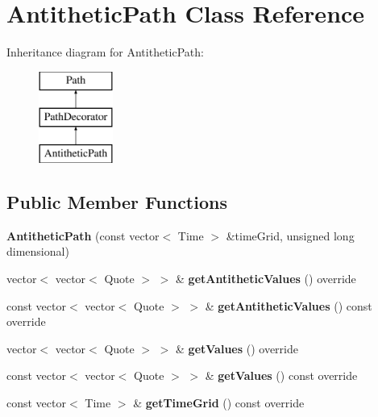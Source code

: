 \hypertarget{class_antithetic_path}{}\section{Antithetic\+Path Class Reference}
\label{class_antithetic_path}
Inheritance diagram for Antithetic\+Path\+:\begin{figure}[H]
\begin{center}
\leavevmode
\includegraphics[height=3.000000cm]{class_antithetic_path}
\end{center}
\end{figure}
\subsection*{Public Member Functions}
\begin{DoxyCompactItemize}
\item 
\hypertarget{class_antithetic_path_a3064f50d9c097f15a0472c94871911cc}{}\label{class_antithetic_path_a3064f50d9c097f15a0472c94871911cc} 
{\bfseries Antithetic\+Path} (const vector$<$ Time $>$ \&time\+Grid, unsigned long dimensional)
\item 
\hypertarget{class_antithetic_path_a7f94c2a66c0d16ebedba930fbca9d859}{}\label{class_antithetic_path_a7f94c2a66c0d16ebedba930fbca9d859} 
vector$<$ vector$<$ Quote $>$ $>$ \& {\bfseries get\+Antithetic\+Values} () override
\item 
\hypertarget{class_antithetic_path_a7b6c87162d9c4642dda68b4f9af5f653}{}\label{class_antithetic_path_a7b6c87162d9c4642dda68b4f9af5f653} 
const vector$<$ vector$<$ Quote $>$ $>$ \& {\bfseries get\+Antithetic\+Values} () const override
\item 
\hypertarget{class_antithetic_path_a631294808de3c75c98563f292464a7da}{}\label{class_antithetic_path_a631294808de3c75c98563f292464a7da} 
vector$<$ vector$<$ Quote $>$ $>$ \& {\bfseries get\+Values} () override
\item 
\hypertarget{class_antithetic_path_ad15cfc2a074fd27bd3119ddafa24c3bd}{}\label{class_antithetic_path_ad15cfc2a074fd27bd3119ddafa24c3bd} 
const vector$<$ vector$<$ Quote $>$ $>$ \& {\bfseries get\+Values} () const override
\item 
\hypertarget{class_antithetic_path_a8986e32381ea393159a15dc2b1c0b12c}{}\label{class_antithetic_path_a8986e32381ea393159a15dc2b1c0b12c} 
const vector$<$ Time $>$ \& {\bfseries get\+Time\+Grid} () const override
\end{DoxyCompactItemize}

